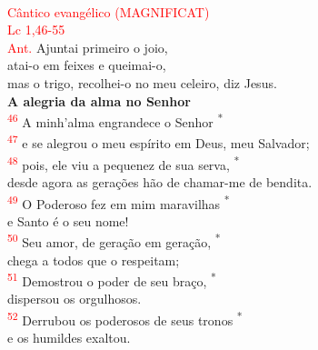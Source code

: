 \documentclass{book}
\begin{document}
\begin{center}
    \vspace{.2cm} \\
    \textcolor{red}{Cântico evangélico (MAGNIFICAT) \\ Lc 1,46-55}
    \vspace{.2cm} \\
    \textcolor{red}{Ant.} Ajuntai primeiro o joio, \\
    atai-o em feixes e queimai-o, \\
    mas o trigo, recolhei-o no meu celeiro, diz Jesus.
    \vspace{.2cm} \\
    \textbf{A alegria da alma no Senhor}
    \vspace{.2cm} \\
    \textsuperscript{\underline{\hspace{.07in}}\textcolor{red}{46}} A minh'alma engrandece o Senhor \textsuperscript{*} \\
    \textsuperscript{\textcolor{red}{47}} e se alegrou o meu espírito em Deus, meu Salvador; \\
    \textsuperscript{\underline{\hspace{.07in}}\textcolor{red}{48}} pois, ele viu a pequenez de sua serva, \textsuperscript{*}\\
    desde agora as gerações hão de chamar-me de bendita.
    \vspace{.2cm} \\
    \textsuperscript{\underline{\hspace{.07in}}\textcolor{red}{49}} O Poderoso fez em mim maravilhas \textsuperscript{*} \\
    e Santo é o seu nome! \\
    \textsuperscript{\underline{\hspace{.07in}}\textcolor{red}{50}} Seu amor, de geração em geração, \textsuperscript{*} \\
    chega a todos que o respeitam;
    \vspace{.2cm} \\
    \textsuperscript{\underline{\hspace{.07in}}\textcolor{red}{51}} Demostrou o poder de seu braço, \textsuperscript{*} \\
    dispersou os orgulhosos. \\
    \textsuperscript{\underline{\hspace{.07in}}\textcolor{red}{52}} Derrubou os poderosos de seus tronos \textsuperscript{*} \\
    e os humildes exaltou.

\end{center}
\end{document}
